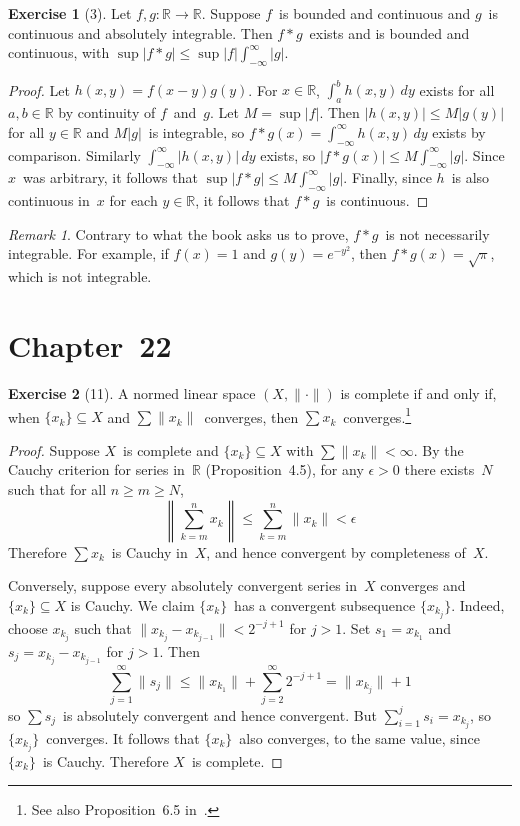 \documentclass[letterpaper,12pt]{article}
\newcommand{\R}{\mathbb{R}}
\newcommand{\conv}{\ast}
\renewcommand{\d}[1]{\,d\!{#1}}
\newcommand{\dy}{\d{y}}
\newcommand{\abs}[1]{|{#1}|}
\newcommand{\norm}[1]{\lVert{#1}\rVert}
\newcommand{\bignorm}[1]{\left\lVert{#1}\right\rVert}
\theoremstyle{plain}
\theoremstyle{definition}
\newtheorem*{exer}{Exercise}
\theoremstyle{remark}
\newtheorem*{rmk}{Remark}
\begin{document}
\begin{exer}[3]
Let \(f,g:\R\to\R\). Suppose \(f\)~is bounded and continuous and \(g\)~is continuous and absolutely integrable. Then \(f\conv g\)~exists and is bounded and continuous, with \(\sup\abs{f\conv g}\le\sup\abs{f}\int_{-\infty}^{\infty}\abs{g}\).
\end{exer}
\begin{proof}
Let \(h(x,y)=f(x-y)g(y)\). For \(x\in\R\), \(\int_a^b h(x,y)\dy\) exists for all \(a,b\in\R\) by continuity of \(f\)~and~\(g\). Let \(M=\sup\abs{f}\). Then \(\abs{h(x,y)}\le M\abs{g(y)}\) for all \(y\in\R\) and \(M\abs{g}\)~is integrable, so \(f\conv g(x)=\int_{-\infty}^{\infty}h(x,y)\dy\) exists by comparison. Similarly \(\int_{-\infty}^{\infty}\abs{h(x,y)}\dy\) exists, so \(\abs{f\conv g(x)}\le M\int_{-\infty}^{\infty}\abs{g}\). Since \(x\)~was arbitrary, it follows that \(\sup{\abs{f\conv g}}\le M\int_{-\infty}^{\infty}\abs{g}\). Finally, since \(h\)~is also continuous in~\(x\) for each \(y\in\R\), it follows that \(f\conv g\)~is continuous.
\end{proof}
\begin{rmk}
Contrary to what the book asks us to prove, \(f\conv g\)~is not necessarily integrable. For example, if \(f(x)=1\) and \(g(y)=e^{-y^2}\), then \(f\conv g(x)=\sqrt{\pi}\), which is not integrable.
\end{rmk}

\section*{Chapter~22}
\begin{exer}[11]
A normed linear space \((X,\norm{\cdot})\) is complete if and only if, when \(\{x_k\}\subseteq X\) and \(\sum\norm{x_k}\)~converges, then \(\sum x_k\)~converges.\footnote{See also Proposition~6.5 in~\cite{royden}.}
\end{exer}
\begin{proof}
Suppose \(X\)~is complete and \(\{x_k\}\subseteq X\) with \(\sum\norm{x_k}<\infty\). By the Cauchy criterion for series in~\(\R\) (Proposition~4.5), for any \(\epsilon>0\) there exists~\(N\) such that for all \(n\ge m\ge N\),
\[\bignorm{\sum_{k=m}^n x_k}\le\sum_{k=m}^n\norm{x_k}<\epsilon\]
Therefore \(\sum x_k\)~is Cauchy in~\(X\), and hence convergent by completeness of~\(X\).

Conversely, suppose every absolutely convergent series in~\(X\) converges and \(\{x_k\}\subseteq X\) is Cauchy. We claim \(\{x_k\}\)~has a convergent subsequence \(\{x_{k_j}\}\). Indeed, choose \(x_{k_j}\) such that \(\norm{x_{k_j}-x_{k_{j-1}}}<2^{-j+1}\) for \(j>1\). Set \(s_1=x_{k_1}\) and \(s_j=x_{k_j}-x_{k_{j-1}}\) for \(j>1\). Then
\[\sum_{j=1}^{\infty}\norm{s_j}\le\norm{x_{k_1}}+\sum_{j=2}^{\infty}2^{-j+1}=\norm{x_{k_j}}+1\]
so \(\sum s_j\)~is absolutely convergent and hence convergent. But \(\sum_{i=1}^j s_i=x_{k_j}\), so \(\{x_{k_j}\}\)~converges. It follows that \(\{x_k\}\)~also converges, to the same value, since \(\{x_k\}\)~is Cauchy. Therefore \(X\)~is complete.
\end{proof}
\end{document}
